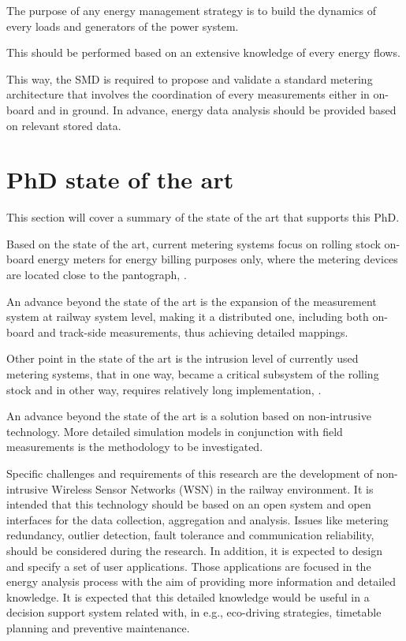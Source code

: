 The purpose of any energy management strategy is to build the dynamics of every loads and generators of the power system. 

This should be performed based on an extensive knowledge of every energy flows. 

This way, the SMD is required to propose and validate a standard metering architecture that involves the coordination of every measurements either in on-board and in ground. 
In advance, energy data analysis should be provided based on relevant stored data. 

\section{PhD state of the art}

This section will cover a summary of the state of the art that supports this PhD.

Based on the state of the art, current metering systems focus on rolling stock on-board energy meters for energy billing purposes only, where the metering devices are located close to the pantograph, \cite{shift2rail2015}.

An advance beyond the state of the art is the expansion of the measurement system at railway system level, making it a distributed one, including both on-board and track-side measurements, thus achieving detailed mappings. 

\vspace{2em}

Other point in the state of the art is the intrusion level of currently used metering systems, that in one way, became a critical subsystem of the rolling stock and in other way, requires relatively long implementation, \cite{shift2rail2015}. 

An advance beyond the state of the art is a solution based on non-intrusive technology. More detailed simulation models in conjunction with field measurements is the methodology to be investigated.




Specific challenges and requirements of this research are the development of non-intrusive Wireless Sensor Networks (WSN)  in the railway environment. 
It is intended that this technology should be based on an open system and open interfaces for the data collection, aggregation and analysis. 
Issues like metering redundancy, outlier detection, fault tolerance and communication reliability, should be considered during the research.
In addition, it is expected to design and specify a set of user applications.
Those applications are focused in the energy analysis process with the aim of providing more information and detailed knowledge.
It is expected that this detailed knowledge would be useful in a decision support system related with, in e.g., eco-driving strategies, timetable planning and preventive maintenance.

